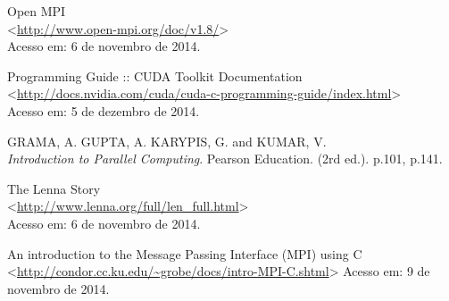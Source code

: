 \newpage

\begin{thebibliography}{9}

		Open MPI\\
		\textless\url{http://www.open-mpi.org/doc/v1.8/}\textgreater\\
		Acesso em: 6 de novembro de 2014.

		Programming Guide :: CUDA Toolkit Documentation\\
		\textless\url{http://docs.nvidia.com/cuda/cuda-c-programming-guide/index.html}\textgreater\\
		Acesso em: 5 de dezembro de 2014.
	
		GRAMA, A. GUPTA, A. KARYPIS, G. and KUMAR, V.\\
		\textit{Introduction to Parallel Computing}. Pearson Education. (2rd ed.). p.101, p.141.

		The Lenna Story\\
		\textless\url{http://www.lenna.org/full/len_full.html}\textgreater\\
		Acesso em: 6 de novembro de 2014.

		An introduction to the Message Passing Interface (MPI) using C \\
		\textless\url{http://condor.cc.ku.edu/~grobe/docs/intro-MPI-C.shtml}\textgreater
		Acesso em: 9 de novembro de 2014.

\end{thebibliography}

